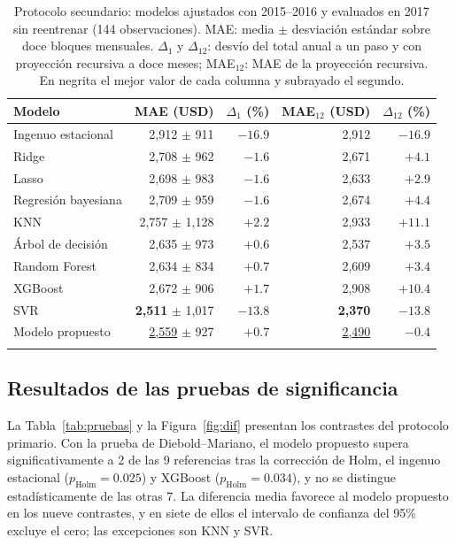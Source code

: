 \documentclass[pdflatex,sn-mathphys-num]{sn-jnl}
\begin{document}
\begin{table}[!htb]
\caption{Protocolo secundario: modelos ajustados con 2015--2016 y evaluados en 2017 sin reentrenar (144 observaciones). MAE: media $\pm$ desviación estándar sobre doce bloques mensuales. $\Delta_1$ y $\Delta_{12}$: desvío del total anual a un paso y con proyección recursiva a doce meses; MAE$_{12}$: MAE de la proyección recursiva. En negrita el mejor valor de cada columna y subrayado el segundo.}\label{tab:fija}
\footnotesize
\begin{tabular*}{\textwidth}{@{\extracolsep\fill}lrrrr}
\toprule
Modelo & MAE (USD) & $\Delta_1$ (\%) & MAE$_{12}$ (USD) & $\Delta_{12}$ (\%) \\
\midrule
Ingenuo estacional & 2{,}912 $\pm$ 911 & $-16.9$ & 2{,}912 & $-16.9$ \\
Ridge & 2{,}708 $\pm$ 962 & $-1.6$ & 2{,}671 & $+4.1$ \\
Lasso & 2{,}698 $\pm$ 983 & $-1.6$ & 2{,}633 & \underline{$+2.9$} \\
Regresión bayesiana & 2{,}709 $\pm$ 959 & $-1.6$ & 2{,}674 & $+4.4$ \\
KNN & 2{,}757 $\pm$ 1{,}128 & $+2.2$ & 2{,}933 & $+11.1$ \\
Árbol de decisión & 2{,}635 $\pm$ 973 & $\mathbf{+0.6}$ & 2{,}537 & $+3.5$ \\
Random Forest & 2{,}634 $\pm$ 834 & \underline{$+0.7$} & 2{,}609 & $+3.4$ \\
XGBoost & 2{,}672 $\pm$ 906 & $+1.7$ & 2{,}908 & $+10.4$ \\
SVR & \textbf{2{,}511} $\pm$ 1{,}017 & $-13.8$ & \textbf{2{,}370} & $-13.8$ \\
Modelo propuesto & \underline{2{,}559} $\pm$ 927 & $+0.7$ & \underline{2{,}490} & $\mathbf{-0.4}$ \\
\botrule
\end{tabular*}
\end{table}

\subsection{Resultados de las pruebas de significancia}\label{subsec:pruebas}

La Tabla~\ref{tab:pruebas} y la Figura~\ref{fig:dif} presentan los contrastes del protocolo primario. Con la prueba de Diebold--Mariano, el modelo propuesto supera significativamente a 2 de las 9 referencias tras la corrección de Holm, el ingenuo estacional ($p_{\mathrm{Holm}}=0.025$) y XGBoost ($p_{\mathrm{Holm}}=0.034$), y no se distingue estadísticamente de las otras 7. La diferencia media favorece al modelo propuesto en los nueve contrastes, y en siete de ellos el intervalo de confianza del 95\% excluye el cero; las excepciones son KNN y SVR.
\end{document}
